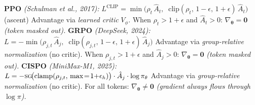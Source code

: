 \documentclass[11pt]{article}
\begin{document}
\begin{algorithm}[t]
\caption{Key Differences: PPO vs GRPO vs CISPO}\label{alg:compare}
\begin{algorithmic}[0]
\Statex \textbf{PPO} \textit{(Schulman et al., 2017):}
\Statex \hspace{\algorithmicindent} $L^{\text{CLIP}} = \min\!\big(\rho_t\, \hat{A}_t,\;\; \text{clip}(\rho_t,\, 1{-}\epsilon,\, 1{+}\epsilon)\, \hat{A}_t\big)$ \; (ascent)
\Statex \hspace{\algorithmicindent} Advantage via \textit{learned critic} $V_\phi$.
\Statex \hspace{\algorithmicindent} When $\rho_t > 1{+}\epsilon$ and $\hat{A}_t > 0$: $\nabla_{\boldsymbol{\theta}} = \mathbf{0}$ \textit{(token masked out).}
\Statex
\Statex \textbf{GRPO} \textit{(DeepSeek, 2024):}
\Statex \hspace{\algorithmicindent} $L = -\min\!\big(\rho_{j,t}\, \hat{A}_j,\;\; \text{clip}(\rho_{j,t},\, 1{-}\epsilon,\, 1{+}\epsilon)\, \hat{A}_j\big)$
\Statex \hspace{\algorithmicindent} Advantage via \textit{group-relative normalization} (no critic).
\Statex \hspace{\algorithmicindent} When $\rho_{j,t} > 1{+}\epsilon$ and $\hat{A}_j > 0$: $\nabla_{\boldsymbol{\theta}} = \mathbf{0}$ \textit{(token masked out).}
\Statex
\Statex \textbf{CISPO} \textit{(MiniMax-M1, 2025):}
\Statex \hspace{\algorithmicindent} $L = -\textsc{sg}\!\big(\text{clamp}(\rho_{j,t},\, \max\!=\!1{+}\epsilon_h)\big) \cdot \hat{A}_j \cdot \log \pi_\theta$
\Statex \hspace{\algorithmicindent} Advantage via \textit{group-relative normalization} (no critic).
\Statex \hspace{\algorithmicindent} For all tokens: $\nabla_{\boldsymbol{\theta}} \neq \mathbf{0}$ \textit{(gradient always flows through $\log \pi$).}
\end{algorithmic}
\end{algorithm}
\end{document}
